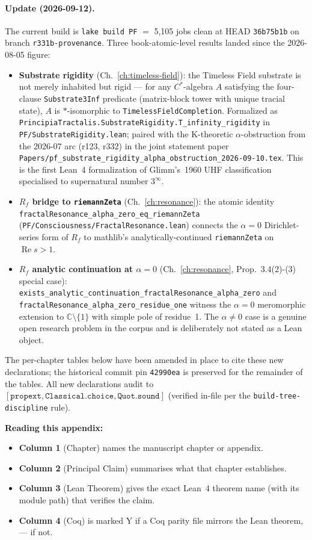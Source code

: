 \paragraph{Update (2026-09-12).} The current build is
\texttt{lake build PF} $=$ 5{,}105 jobs clean at HEAD
\texttt{36b75b1b} on branch \texttt{r331b-provenance}. Three
book-atomic-level results landed since the 2026-08-05 figure:
\begin{itemize}
\item \textbf{Substrate rigidity} (Ch.~\ref{ch:timeless-field}): the
Timeless Field substrate is not merely inhabited but rigid --- for
any $C^*$-algebra $A$ satisfying the four-clause
\texttt{Substrate3Inf} predicate (matrix-block tower with unique
tracial state), $A$ is $*$-isomorphic to
\texttt{TimelessFieldCompletion}. Formalized as
\texttt{PrincipiaTractalis.SubstrateRigidity.T\_infinity\_rigidity}
in \texttt{PF/SubstrateRigidity.lean}; paired with the K-theoretic
$\alpha$-obstruction from the 2026-07 arc (r123, r332) in the joint
statement paper
\texttt{Papers/pf\_substrate\_rigidity\_alpha\_obstruction\_2026-09-10.tex}.
This is the first Lean~4 formalization of Glimm's~1960 UHF
classification specialised to supernatural number $3^\infty$.
\item \textbf{$R_f$ bridge to \texttt{riemannZeta}}
(Ch.~\ref{ch:resonance}): the atomic identity
\texttt{fractalResonance\_alpha\_zero\_eq\_riemannZeta}
(\texttt{PF/Consciousness/FractalResonance.lean}) connects the
$\alpha = 0$ Dirichlet-series form of $R_f$ to mathlib's
analytically-continued \texttt{riemannZeta} on $\operatorname{Re} s
> 1$.
\item \textbf{$R_f$ analytic continuation at $\alpha = 0$}
(Ch.~\ref{ch:resonance}, Prop.~3.4(2)-(3) special case):
\texttt{exists\_analytic\_continuation\_fractalResonance\_alpha\_zero}
and \texttt{fractalResonance\_alpha\_zero\_residue\_one} witness the
$\alpha = 0$ meromorphic extension to $\mathbb{C} \setminus \{1\}$
with simple pole of residue~1. The $\alpha \ne 0$ case is a genuine
open research problem in the corpus and is deliberately not stated
as a Lean object.
\end{itemize}
The per-chapter tables below have been amended in place to cite
these new declarations; the historical commit pin \texttt{42990ea}
is preserved for the remainder of the tables. All new declarations
audit to $[\texttt{propext}, \texttt{Classical.choice},
\texttt{Quot.sound}]$ (verified in-file per the
\texttt{build-tree-discipline} rule).

\textbf{Reading this appendix:}
\begin{itemize}
\item \textbf{Column 1} (Chapter) names the manuscript chapter
or appendix.
\item \textbf{Column 2} (Principal Claim) summarises what that
chapter establishes.
\item \textbf{Column 3} (Lean Theorem) gives the exact Lean~4
theorem name (with its module path) that verifies the claim.
\item \textbf{Column 4} (Coq) is marked Y if a Coq parity file
mirrors the Lean theorem, --- if not.
\end{itemize}

